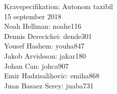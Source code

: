 \documentclass[12pt]{article}
\begin{document}
\begin{center}
    \thispagestyle{empty}
    \vspace*{20mm}
    {\Huge Kravspecifikation: Autonom taxibil}\\
    \vspace{20mm}
    {\large 15 september 2018}\\
    \vspace{20mm}
    Noah Hellman: noahe116 \\
    Dennis Derecichei: dende301 \\
    Yousef Hashem: youha847 \\
    Jakob Arvidsson: jakar180 \\
    Johan Can: johca907 \\
    Emir Hadzisalihovic: emiha868 \\
    Juan Basaez Serey: juaba731
    \newpage
\end{center}

\tableofcontents
\newpage





\end{document}
